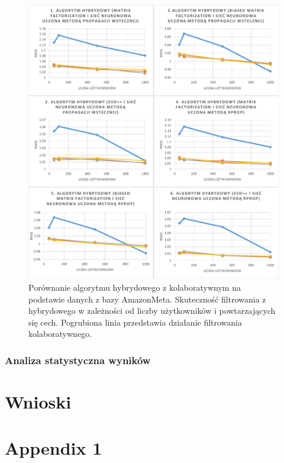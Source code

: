\documentclass[twoside]{iisthesis}
\begin{document}
\begin{figure}[!ht]
	\centering
	\includegraphics[page=2,width=1\textwidth]{exphybrid_amazon2}
	\caption{Porównanie algorytmu hybrydowego z kolaboratywnym na podstawie danych z bazy AmazonMeta. Skuteczność filtrowania z hybrydowego w zależności od liczby użytkowników i powtarzających się cech. Pogrubiona linia przedstawia działanie filtrowania kolaboratywnego.}
	\label{fig:exphybrid_amazon2b}
\end{figure}



		\subsection{Analiza statystyczna wyników}		

\chapter{Wnioski}


\clearpage
\appendix
\chapter{Appendix 1}


\clearpage
\pagestyle{plain}
\listofmyfigure
\listofmyequations
\listofmyalgorithm
\clearpage




\end{document}
